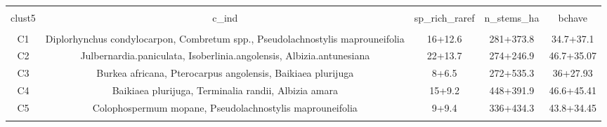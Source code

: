 
\begin{table}[!htbp] \centering 
  \caption{} 
  \label{clust_summ} 
\begin{tabular}{@{\extracolsep{5pt}} ccccc} 
\\[-1.8ex]\hline 
\hline \\[-1.8ex] 
clust5 & c\_ind & sp\_rich\_raref & n\_stems\_ha & bchave \\ 
\hline \\[-1.8ex] 
C1 & Diplorhynchus condylocarpon, Combretum spp., Pseudolachnostylis maprouneifolia & 16+12.6 & 281+373.8 & 34.7+37.1 \\ 
C2 & Julbernardia.paniculata, Isoberlinia.angolensis, Albizia.antunesiana & 22+13.7 & 274+246.9 & 46.7+35.07 \\ 
C3 & Burkea africana, Pterocarpus angolensis, Baikiaea plurijuga & 8+6.5 & 272+535.3 & 36+27.93 \\ 
C4 & Baikiaea plurijuga, Terminalia randii, Albizia amara & 15+9.2 & 448+391.9 & 46.6+45.41 \\ 
C5 & Colophospermum mopane, Pseudolachnostylis maprouneifolia & 9+9.4 & 336+434.3 & 43.8+34.45 \\ 
\hline \\[-1.8ex] 
\end{tabular} 
\end{table} 
